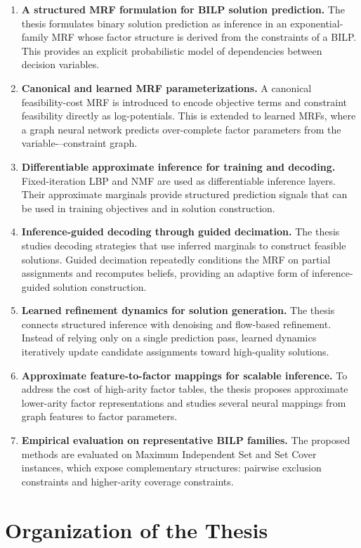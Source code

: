 \begin{enumerate}
    \item \textbf{A structured MRF formulation for BILP solution prediction.} The thesis formulates binary solution prediction as inference in an exponential-family MRF whose factor structure is derived from the constraints of a BILP. This provides an explicit probabilistic model of dependencies between decision variables.
    \item \textbf{Canonical and learned MRF parameterizations.} A canonical feasibility-cost MRF is introduced to encode objective terms and constraint feasibility directly as log-potentials. This is extended to learned MRFs, where a graph neural network predicts over-complete factor parameters from the variable-–constraint graph.
    \item \textbf{Differentiable approximate inference for training and decoding.} Fixed-iteration LBP and NMF are used as differentiable inference layers. Their approximate marginals provide structured prediction signals that can be used in training objectives and in solution construction.
    \item \textbf{Inference-guided decoding through guided decimation.} The thesis studies decoding strategies that use inferred marginals to construct feasible solutions. Guided decimation repeatedly conditions the MRF on partial assignments and recomputes beliefs, providing an adaptive form of inference-guided solution construction.
    \item \textbf{Learned refinement dynamics for solution generation.} The thesis connects structured inference with denoising and flow-based refinement. Instead of relying only on a single prediction pass, learned dynamics iteratively update candidate assignments toward high-quality solutions.
    \item \textbf{Approximate feature-to-factor mappings for scalable inference.} To address the cost of high-arity factor tables, the thesis proposes approximate lower-arity factor representations and studies several neural mappings from graph features to factor parameters.
    \item \textbf{Empirical evaluation on representative BILP families.} The proposed methods are evaluated on Maximum Independent Set and Set Cover instances, which expose complementary structures: pairwise exclusion constraints and higher-arity coverage constraints.
\end{enumerate}

\section{Organization of the Thesis}

